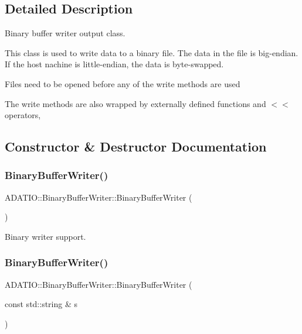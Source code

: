 \subsection{Detailed Description}
Binary buffer writer output class. 

This class is used to write data to a binary file. The data in the file is big-\/endian. If the host nachine is little-\/endian, the data is byte-\/swapped.

Files need to be opened before any of the write methods are used

The write methods are also wrapped by externally defined functions and $<$$<$ operators, 

\subsection{Constructor \& Destructor Documentation}
\mbox{\label{classADATIO_1_1BinaryBufferWriter_a3812e6b5808e6349bae019f79d78094a}} 
\subsubsection{\texorpdfstring{BinaryBufferWriter()}{BinaryBufferWriter()}\hspace{0.1cm}{\footnotesize\ttfamily [1/6]}}
{\footnotesize\ttfamily A\+D\+A\+T\+I\+O\+::\+Binary\+Buffer\+Writer\+::\+Binary\+Buffer\+Writer (\begin{DoxyParamCaption}{ }\end{DoxyParamCaption})}



Binary writer support. 

\mbox{\label{classADATIO_1_1BinaryBufferWriter_acdbd4afbd1fde21aff3ad80d3c67a43c}} 
\subsubsection{\texorpdfstring{BinaryBufferWriter()}{BinaryBufferWriter()}\hspace{0.1cm}{\footnotesize\ttfamily [2/6]}}
{\footnotesize\ttfamily A\+D\+A\+T\+I\+O\+::\+Binary\+Buffer\+Writer\+::\+Binary\+Buffer\+Writer (\begin{DoxyParamCaption}\item[{const std\+::string \&}]{s }\end{DoxyParamCaption})\hspace{0.3cm}{\ttfamily [explicit]}}



